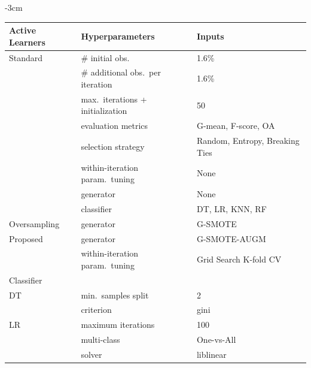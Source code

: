 \documentclass[preprint, 12pt]{elsarticle}
\begin{document}
\begin{table}[H]
	\centering
    \addtolength{\leftskip} {-3cm}
    \addtolength{\rightskip}{-3cm}
	\begin{tabular}{lll}
		\toprule
		Active Learners & Hyperparameters                   & Inputs                         \\
		\midrule
		Standard        & \# initial obs.\                  & 1.6\%                          \\
                        & \# additional obs.\ per iteration & 1.6\%                          \\
                        & max.\ iterations + initialization & 50                             \\
                        & evaluation metrics                & G-mean, F-score, OA            \\
                        & selection strategy                & Random, Entropy, Breaking Ties \\
                        & within-iteration param.\ tuning   & None                           \\
                        & generator                         & None                           \\
                        & classifier                        & DT, LR, KNN, RF                \\
        Oversampling    & generator                         & G-SMOTE                        \\
        Proposed        & generator                         & G-SMOTE-AUGM                   \\
                        & within-iteration param.\ tuning   & Grid Search K-fold CV          \\
		\toprule
		Classifier      &                                  &                                \\
		\midrule
        DT              & min.\ samples split              & 2                              \\
                        & criterion                        & gini                           \\
		LR              & maximum iterations               & 100                            \\
                        & multi-class                      & One-vs-All                     \\
		                & solver                           & liblinear                      \\

\end{tabular}
\end{table}
\end{document}
